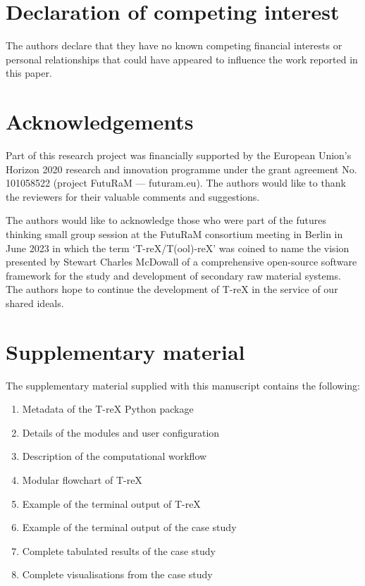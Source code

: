 \documentclass[review,3p,authoryear]{elsarticle}
\begin{document}
\section*{Declaration of competing interest}
The authors declare that they have no known competing financial interests or personal relationships that could have appeared to influence the work reported in this paper.

\section*{Acknowledgements}
Part of this research project was financially supported by the European Union's Horizon 2020 research and innovation programme under the grant agreement No. 101058522 (project FutuRaM --- futuram.eu). The authors would like to thank the reviewers for their valuable comments and suggestions.

The authors would like to acknowledge those who were part of the futures thinking small group session at the FutuRaM consortium meeting in Berlin in June 2023 in which the term `T-reX/T(ool)-reX' was coined to name the vision presented by Stewart Charles McDowall of a comprehensive open-source software framework for the study and development of secondary raw material systems. The authors hope to continue the development of T-reX in the service of our shared ideals.

\section{Supplementary material}\label{sec:supplementary}
The supplementary material supplied with this manuscript contains the following:
\begin{enumerate}
    \item Metadata of the T-reX Python package
    \item Details of the modules and user configuration
    \item Description of the computational workflow
    \item Modular flowchart of T-reX
    \item Example of the terminal output of T-reX
    \item Example of the terminal output of the case study
    \item Complete tabulated results of the case study
    \item Complete visualisations from the case study
\end{enumerate}




\end{document}
